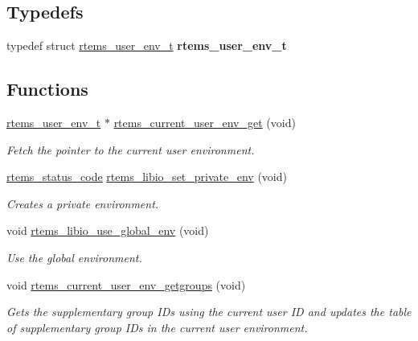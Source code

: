 \subsection*{Typedefs}
\begin{DoxyCompactItemize}
\item 
\mbox{\label{group__LibIOEnv_ga35f3d5ba64979aa819534ff684974df4}} 
typedef struct \mbox{\hyperlink{structrtems__user__env__t}{rtems\+\_\+user\+\_\+env\+\_\+t}} {\bfseries rtems\+\_\+user\+\_\+env\+\_\+t}
\end{DoxyCompactItemize}
\subsection*{Functions}
\begin{DoxyCompactItemize}
\item 
\mbox{\hyperlink{structrtems__user__env__t}{rtems\+\_\+user\+\_\+env\+\_\+t}} $\ast$ \mbox{\hyperlink{group__LibIOEnv_gae0ea3b12bb890c1f272b6d049a486160}{rtems\+\_\+current\+\_\+user\+\_\+env\+\_\+get}} (void)
\begin{DoxyCompactList}\small\item\em Fetch the pointer to the current user environment. \end{DoxyCompactList}\item 
\mbox{\hyperlink{group__ClassicStatus_ga545d41846817eaba6143d52ee4d9e9fe}{rtems\+\_\+status\+\_\+code}} \mbox{\hyperlink{group__LibIOEnv_ga2026f741b68624a75d0cfc1957f75f62}{rtems\+\_\+libio\+\_\+set\+\_\+private\+\_\+env}} (void)
\begin{DoxyCompactList}\small\item\em Creates a private environment. \end{DoxyCompactList}\item 
void \mbox{\hyperlink{group__LibIOEnv_ga549907ac3a4bf0a2434bc55dda57b5ef}{rtems\+\_\+libio\+\_\+use\+\_\+global\+\_\+env}} (void)
\begin{DoxyCompactList}\small\item\em Use the global environment. \end{DoxyCompactList}\item 
void \mbox{\hyperlink{group__LibIOEnv_ga24e63d00d8f74b3bf2a6d86f0b26a826}{rtems\+\_\+current\+\_\+user\+\_\+env\+\_\+getgroups}} (void)
\begin{DoxyCompactList}\small\item\em Gets the supplementary group I\+Ds using the current user ID and updates the table of supplementary group I\+Ds in the current user environment. \end{DoxyCompactList}\end{DoxyCompactItemize}
